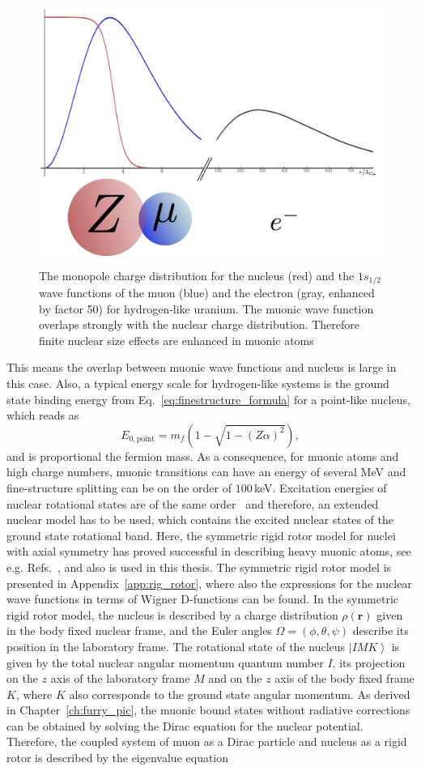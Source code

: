 %
\begin{figure}%
\centering
\includegraphics[width=0.75\linewidth]{pics/muon_groundState.pdf}%
\caption{The monopole charge distribution for the nucleus (red) and the $1s_{1/2}$ wave functions of the muon (blue) and the electron (gray, enhanced by factor 50) for hydrogen-like uranium. The muonic wave function overlaps strongly with the nuclear charge distribution. Therefore finite nuclear size effects are enhanced in muonic atoms}%
\label{fig:muonGS}%
\end{figure}
%
This means the overlap between muonic wave functions and nucleus is large in this case. Also, a typical energy scale for hydrogen-like systems is the ground state binding energy from Eq.~\eqref{eq:finestructure_formula} for a point-like nucleus, which reads as
\begin{equation}
E_{0,\text{point}}=m_f (1-\sqrt{1-(Z\alpha)^2}),
\end{equation}
and is proportional the fermion mass. As a consequence, for muonic atoms and high charge numbers, muonic transitions can have an energy of several MeV and fine-structure splitting can be on the order of $100\,$keV. Excitation energies of nuclear rotational states are of the same order~\cite{ENSDF} and therefore, an extended nuclear model has to be used, which contains the excited nuclear states of the ground state rotational band. Here, the symmetric rigid rotor model for nuclei with axial symmetry has proved successful in describing heavy muonic atoms, see e.g. Refs.~\cite{tanaka1984,hitlin1970,wu1969,Devons1995}, and also is used in this thesis. The symmetric rigid rotor model is presented in Appendix~\ref{app:rig_rotor}, where also the expressions for the nuclear wave functions in terms of Wigner D-functions can be found. In the symmetric rigid rotor model, the nucleus is described by a charge distribution $\rho(\mathbf{r})$ given in the body fixed nuclear frame, and the Euler angles $\Omega=(\phi,\theta,\psi)$ describe its position in the laboratory frame. The rotational state of the nucleus $\left|IMK\right>$ is given by the total nuclear angular momentum quantum number $I$, its projection on the $z$ axis of the laboratory frame $M$ and on the $z$ axis of the body fixed frame $K$, where $K$ also corresponds to the ground state angular momentum. As derived in Chapter~\ref{ch:furry_pic}, the muonic bound states without radiative corrections can be obtained by solving the Dirac equation for the nuclear potential. Therefore, the coupled system of muon as a Dirac particle and nucleus as a rigid rotor is described by the eigenvalue equation

